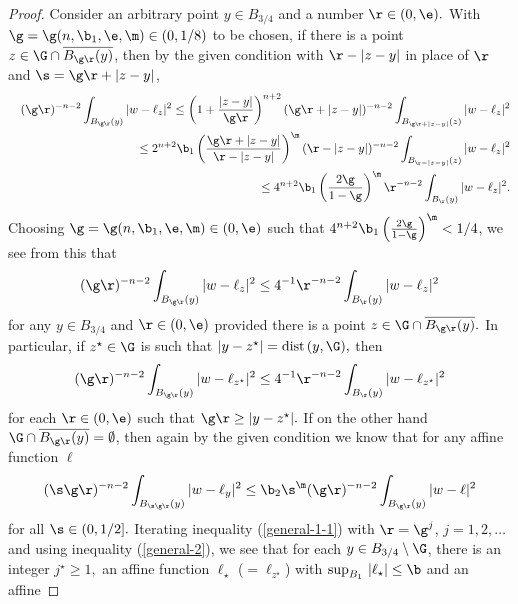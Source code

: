 \documentclass[a4paper,11pt]{amsart}
\begin{document}
\begin{proof} Consider an arbitrary point 
$y \in B_{3/4}$ and a number $\r \in (0, \e).$ With $\g = \g(n, \b_{1}, \e, \m) \in (0, 1/8)$ to be chosen, if there is a point $z \in \G \cap \overline{B_{\g\r}(y)}$, then by the given condition
with  $\r - |z - y|$ in place of $\r$ and $\s = \g\r + |z-y|$, 
\begin{eqnarray*}
&&(\g\r)^{-n-2}\int_{B_{\g\r}(y)} |w - \ell_{z}|^{2} \leq \left(1 + \frac{|z-y|}{\g\r}\right)^{n+2} (\g\r + |z-y|)^{-n-2} \int_{B_{\g\r + |z-y|}(z)} |w - \ell_{z}|^{2} \nonumber\\ 
&&\hspace{1in}\leq 2^{n+2}\b_{1}\left(\frac{\g\r + |z-y|}{\r - |z-y|}\right)^{\m} (\r - |z - y|)^{-n-2}\int_{B_{\r - |z-y|}(z)} |w - \ell_{z}|^{2}\nonumber\\ 
&&\hspace{1in}\leq 4^{n+2}\b_{1} \left(\frac{2\g}{1 - \g}\right)^{\m} \r^{-n-2}\int_{B_{\r}(y)} |w - \ell_{z}|^{2}.
\end{eqnarray*}
Choosing $\g = \g(n, \b_{1}, \e, \m) \in (0, \e)$ such that $4^{n+2}\b_{1} \left(\frac{2\g}{1 - \g}\right)^{\m} < 1/4$, 
we see from this that 
\begin{equation*}\label{general-1}
(\g\r)^{-n-2}\int_{B_{\g\r}(y)} |w - \ell_{z}|^{2}  
\leq 4^{-1}\r^{-n-2}\int_{B_{\r}(y)} |w - \ell_{z}|^{2}
\end{equation*} 
for any $y \in B_{3/4}$ and $\r \in (0, \e)$ provided there is a point $z \in \G \cap \overline{B_{\g\r}(y)}.$ In particular, 
if $z^{\star} \in \G$ is such that $|y - z^{\star}| = {\rm dist} \, (y, \G),$ then 
\begin{equation}\label{general-1-1}
(\g\r)^{-n-2}\int_{B_{\g\r}(y)} |w - \ell_{z^{\star}}|^{2}  
\leq 4^{-1}\r^{-n-2}\int_{B_{\r}(y)} |w - \ell_{z^{\star}}|^{2}
\end{equation} 
for each $\r \in (0, \e)$ such that $\g\r \geq|y - z^{\star}|.$ If on the other hand $\G \cap \overline{B_{\g\r}(y)}  = \emptyset$, then again by the given condition we know that for any affine function $\ell$
 \begin{equation}\label{general-2}
(\s\g\r)^{-n-2}\int_{B_{\s\g\r}(y)}|w - \ell_{y}|^{2} \leq \b_{2}\s^{\m}(\g\r)^{-n-2}\int_{B_{\g\r}(y)}|w - \ell|^{2}
\end{equation}
for all $\s \in (0, 1/2].$ Iterating  inequality (\ref{general-1-1}) with $\r = \g^{j}$, $j=1, 2, \ldots$ and using inequality (\ref{general-2}), we see that for each $y \in B_{3/4} \setminus \G$, there is an integer $j^{\star} \geq 1,$ an affine function $\ell_{\star}$ ($= \ell_{z^{\star}}$) with $\sup_{B_{1}} \, |\ell_{\star}| \leq \b$ and an affine 

\end{proof}
\end{document}
